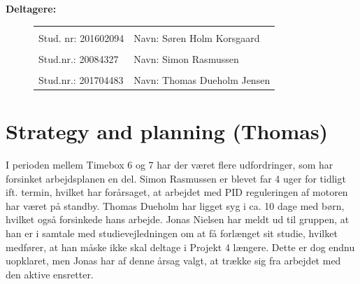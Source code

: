 \textbf{Deltagere:}
\begin{figure}[h]
  \centering
  \begin{tabular}{|p{5cm}p{10cm}|}
    \hline
    &\\
    Stud. nr: 201602094 & Navn: Søren Holm Korsgaard \\
    \hline
    &\\
    Stud.nr.: 20084327 & Navn: Simon Rasmussen \\
    \hline
    &\\
    Stud.nr.: 201704483 & Navn: Thomas Dueholm Jensen \\
    \hline
  \end{tabular}

\end{figure}
\vspace{-5mm}
\setcounter{tocdepth}{2}
\tableofcontents
\thispagestyle{empty}
\newpage
\setcounter{page}{1}


\section{Strategy and planning (Thomas)}
\label{sec:strategy-planning}

I perioden mellem Timebox 6 og 7 har der været flere udfordringer, som har forsinket arbejdsplanen en del. Simon Rasmussen er blevet far 4 uger for tidligt ift. termin, hvilket har forårsaget, at arbejdet med PID reguleringen af motoren har været på standby. Thomas Dueholm har ligget syg i ca. 10 dage med børn, hvilket også forsinkede hans arbejde. Jonas Nielsen har meldt ud til gruppen, at han er i samtale med studievejledningen om at få forlænget sit studie, hvilket medfører, at han måske ikke skal deltage i Projekt 4 længere. Dette er dog endnu uopklaret, men Jonas har af denne årsag valgt, at trække sig fra arbejdet med den aktive ensretter.

